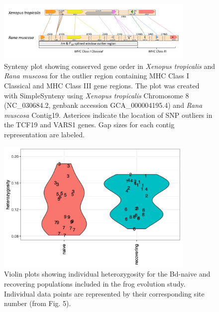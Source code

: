\documentclass[9pt,twoside,lineno]{pnas-new-SI}
\begin{document}
\begin{figure}

{\centering \includegraphics[width=0.85\textwidth]{figures/synteny_figure.png}

}

\caption{\label{fig-synteny-plot}Synteny plot showing conserved gene
order in \emph{Xenopus tropicalis} and \emph{Rana muscosa} for the
outlier region containing MHC Class I Classical and MHC Class III gene
regions. The plot was created with SimpleSynteny \citep{veltri2016}
using \emph{Xenopus tropicalis} Chromosome 8 (NC\_030684.2, genbank
accession GCA\_000004195.4) and \emph{Rana muscosa} Contig19. Asterices
indicate the location of SNP outliers in the TCF19 and VARS1 genes. Gap
sizes for each contig representation are labeled.}

\end{figure}\clearpage

\newpage

\begin{figure}

{\centering \includegraphics[width=0.85\textwidth]{figures/violin_plot_heterozy_by_group.png}

}

\caption{\label{fig-violinplot-heterozy}Violin plots showing individual
heterozygosity for the Bd-naive and recovering populations included in
the frog evolution study. Individual data points are represented by
their corresponding site number (from
Fig. 5).}

\end{figure}\clearpage
\end{document}
